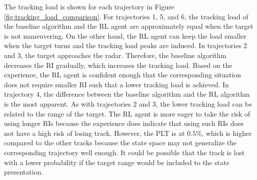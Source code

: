 \documentclass[english, 12pt, a4paper, elec, utf8, a-1b, online]{aaltothesis}
\numberwithin{equation}{section}
\begin{document}
The tracking load is shown for each trajectory in Figure \ref{fig:tracking_load_comparison}.
For trajectories 1, 5, and 6, the tracking load of the baseline algorithm and the RL agent are approximately equal when the target is not maneuvering.
On the other hand, the RL agent can keep the load smaller when the target turns and the tracking load peaks are induced.
In trajectories 2 and 3, the target approaches the radar. 
Therefore, the baseline algorithm decreases the RI gradually, which increases the tracking load.
Based on the experience, the RL agent is confident enough that the corresponding situation does not require smaller RI such that a lower tracking load is achieved.
In trajectory 4, the difference between the baseline algorithm and the RL algorithm is the most apparent.
As with trajectories 2 and 3, the lower tracking load can be related to the range of the target.
The RL agent is more eager to take the risk of using longer RIs because the experience does indicate that using such RIs does not have a high risk of losing track.
However, the PLT is at $0.5\%$, which is higher compared to the other tracks because the state space may not generalize the corresponding trajectory well enough.
It could be possible that the track is lost with a lower probability if the target range would be included to the state presentation.
\end{document}
